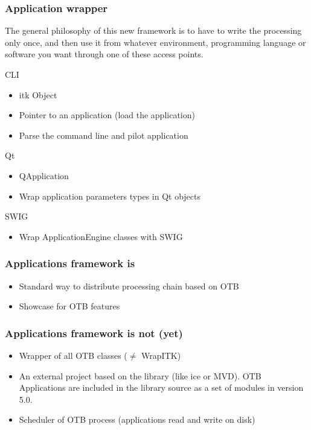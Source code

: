 \documentclass[8pt]{beamer}
\begin{document}
\begin{frame}
\frametitle{Application wrapper}
The general philosophy of this new framework is to have to write the processing
only once, and then use it from whatever environment, programming language or
software you want through one of these access points.

\begin{block}{CLI}
\begin{itemize}
\item itk Object
\item Pointer to an application (load the application)
\item Parse the command line and pilot application
\end{itemize}
\end{block}

\begin{block}{Qt}
\begin{itemize}
\item QApplication
\item Wrap application parameters types in Qt objects
\end{itemize}
\end{block}

\begin{block}{SWIG}
\begin{itemize}
\item Wrap ApplicationEngine classes with SWIG
\end{itemize}
\end{block}
\end{frame}

\begin{frame}
\frametitle{Applications framework is}
\begin{itemize}
\item Standard way to distribute processing chain based on OTB
\item Showcase for OTB features
\end{itemize}
\end{frame}

\begin{frame}
\frametitle{Applications framework is not (yet)}
\begin{itemize}
\item Wrapper of all OTB classes ($\neq$ WrapITK)
\item An external project based on the library (like ice or MVD). OTB
Applications are included in the library source as a set of modules in
version 5.0.
\item Scheduler of OTB process (applications read and write on disk)
\end{itemize}
\end{frame}
\end{document}
